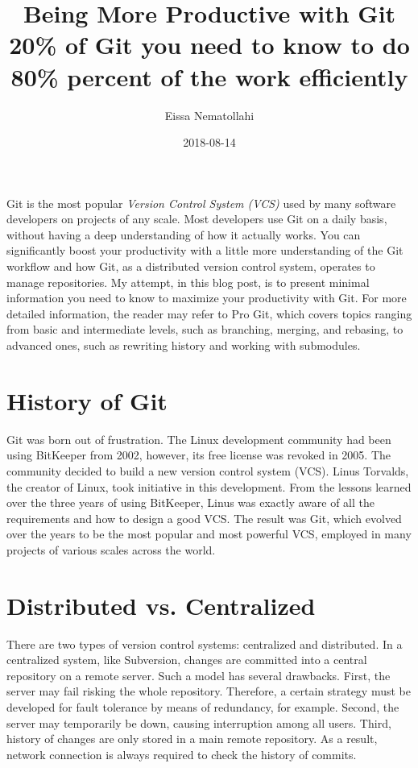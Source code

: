 \documentclass[11pt]{article}
\author{Eissa Nematollahi}
\date{2018-08-14}
\title{Being More Productive with Git\\\medskip
\large 20\% of Git you need to know to do 80\% percent of the work efficiently}
\begin{document}
\maketitle
\tableofcontents
\clearpage 
Git is the most popular \emph{Version Control System (VCS)} used by many software developers on projects of any scale. Most developers use Git on a daily basis, without having a deep understanding of how it actually works. You can significantly boost your productivity with a little more understanding of the Git workflow and how Git, as a distributed version control system, operates to manage repositories. My attempt, in this blog post, is to present minimal information you need to know to maximize your productivity with Git. For more detailed information, the reader may refer to Pro Git, which covers topics ranging from basic and intermediate levels, such as branching, merging, and rebasing, to advanced ones, such as rewriting history and working with submodules.

\section{History of Git}
\label{sec:orgheadline1}
Git was born out of frustration. The Linux development community had been using BitKeeper from 2002, however, its free license was revoked in 2005. The community decided to build a new version control system (VCS). Linus Torvalds, the creator of Linux, took initiative in this development. From the lessons learned over the three years of using BitKeeper, Linus was exactly aware of all the requirements and how to design a good VCS. The result was Git, which evolved over the years to be the most popular and most powerful VCS, employed in many projects of various scales across the world.

\section{Distributed vs. Centralized}
\label{sec:orgheadline2}
There are two types of version control systems: centralized and distributed. In a centralized system, like Subversion, changes are committed into a central repository on a remote server. Such a model has several drawbacks. First, the server may fail risking the whole repository. Therefore, a certain strategy must be developed for fault tolerance by means of redundancy, for example. Second, the server may temporarily be down, causing interruption among all users. Third, history of changes are only stored in a main remote repository. As a result, network connection is always required to check the history of commits.
\end{document}
